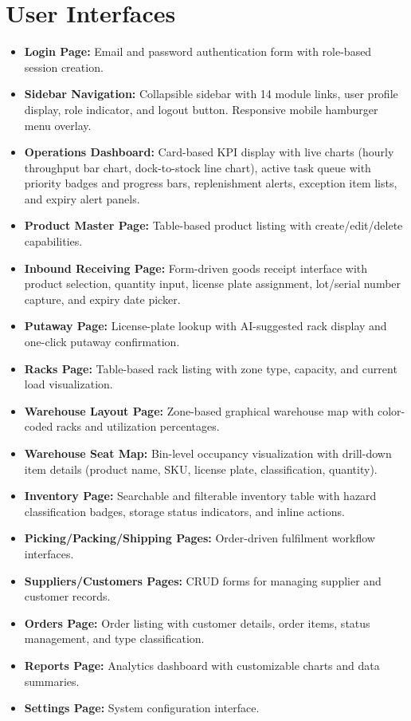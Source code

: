 \documentclass[12pt,a4paper]{report}
\begin{document}
\section{User Interfaces}
\begin{itemize}
    \item \textbf{Login Page:} Email and password authentication form with role-based session creation.
    \item \textbf{Sidebar Navigation:} Collapsible sidebar with 14 module links, user profile display, role indicator, and logout button. Responsive mobile hamburger menu overlay.
    \item \textbf{Operations Dashboard:} Card-based KPI display with live charts (hourly throughput bar chart, dock-to-stock line chart), active task queue with priority badges and progress bars, replenishment alerts, exception item lists, and expiry alert panels.
    \item \textbf{Product Master Page:} Table-based product listing with create/edit/delete capabilities.
    \item \textbf{Inbound Receiving Page:} Form-driven goods receipt interface with product selection, quantity input, license plate assignment, lot/serial number capture, and expiry date picker.
    \item \textbf{Putaway Page:} License-plate lookup with AI-suggested rack display and one-click putaway confirmation.
    \item \textbf{Racks Page:} Table-based rack listing with zone type, capacity, and current load visualization.
    \item \textbf{Warehouse Layout Page:} Zone-based graphical warehouse map with color-coded racks and utilization percentages.
    \item \textbf{Warehouse Seat Map:} Bin-level occupancy visualization with drill-down item details (product name, SKU, license plate, classification, quantity).
    \item \textbf{Inventory Page:} Searchable and filterable inventory table with hazard classification badges, storage status indicators, and inline actions.
    \item \textbf{Picking/Packing/Shipping Pages:} Order-driven fulfilment workflow interfaces.
    \item \textbf{Suppliers/Customers Pages:} CRUD forms for managing supplier and customer records.
    \item \textbf{Orders Page:} Order listing with customer details, order items, status management, and type classification.
    \item \textbf{Reports Page:} Analytics dashboard with customizable charts and data summaries.
    \item \textbf{Settings Page:} System configuration interface.
\end{itemize}
\end{document}
